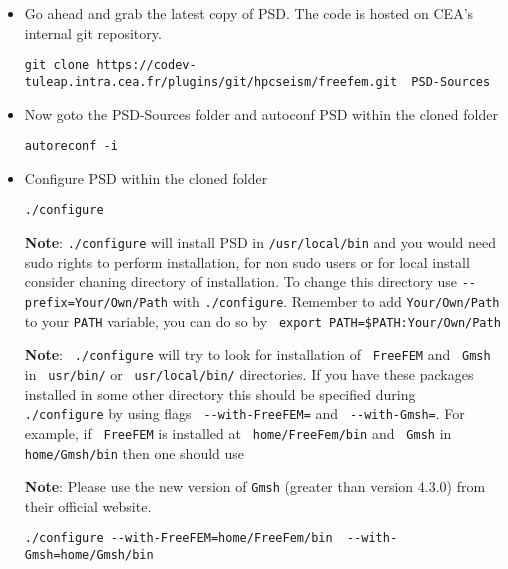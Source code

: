 \begin{itemize}
\item  Go ahead and grab the latest copy of PSD. The code is hosted on CEA's internal git repository.

\begin{lstlisting}[style=Linux]
git clone https://codev-tuleap.intra.cea.fr/plugins/git/hpcseism/freefem.git  PSD-Sources
\end{lstlisting}

\item  Now goto the {\ttfamily PSD-Sources} folder and autoconf PSD within the  cloned folder

\begin{lstlisting}[style=Linux]
autoreconf -i
\end{lstlisting}

\item Configure  PSD within the  cloned folder
\begin{lstlisting}[style=Linux]
./configure
\end{lstlisting}
\textbf{Note}:  \lstinline[style=Linux]!./configure! will install PSD in \lstinline[style=Linux]!/usr/local/bin! and you would need sudo rights to perform installation, for non sudo users or for local install consider chaning directory of installation. To change this directory use \lstinline[style=Linux]!--prefix=Your/Own/Path! with \lstinline[style=Linux]!./configure!. Remember to add \lstinline[style=Linux]!Your/Own/Path! to your  \lstinline[style=Linux]!PATH! variable, you can do so by \lstinline[style=Linux]! export PATH=$PATH:Your/Own/Path!

\textbf{Note}:   \lstinline[style=Linux]! ./configure! will try to look for installation of \lstinline[style=Linux]! FreeFEM! and \lstinline[style=Linux]! Gmsh! in \lstinline[style=Linux]! usr/bin/! or \lstinline[style=Linux]! usr/local/bin/! directories. If you have these packages installed in some other directory this should be specified during \lstinline[style=Linux]! ./configure! by using flags \lstinline[style=Linux]! --with-FreeFEM=! and \lstinline[style=Linux]! --with-Gmsh=!. For example, if \lstinline[style=Linux]! FreeFEM! is installed at \lstinline[style=Linux]! home/FreeFem/bin! and \lstinline[style=Linux]! Gmsh! in \lstinline[style=Linux]!home/Gmsh/bin! then one should use

\textbf{Note}: Please use the new version of \lstinline[style=Linux]!Gmsh! (greater than version 4.3.0) from their official website.

\begin{lstlisting}[style=Linux]
./configure --with-FreeFEM=home/FreeFem/bin  --with-Gmsh=home/Gmsh/bin
\end{lstlisting}


\end{itemize}
